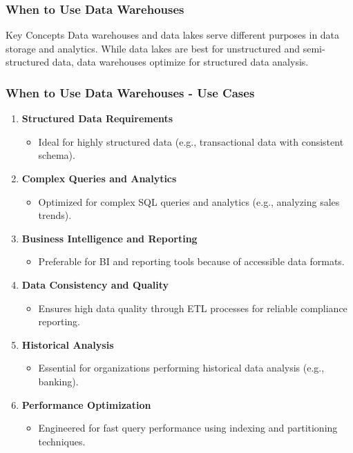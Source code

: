 \documentclass[aspectratio=169]{beamer}
\begin{document}
\begin{frame}[fragile]
  \frametitle{When to Use Data Warehouses}
  \begin{block}{Key Concepts}
    Data warehouses and data lakes serve different purposes in data storage and analytics.
    While data lakes are best for unstructured and semi-structured data, data warehouses optimize for structured data analysis.
  \end{block}
\end{frame}

\begin{frame}[fragile]
  \frametitle{When to Use Data Warehouses - Use Cases}
  \begin{enumerate}
    \item \textbf{Structured Data Requirements}
      \begin{itemize}
        \item Ideal for highly structured data (e.g., transactional data with consistent schema).
      \end{itemize}
      
    \item \textbf{Complex Queries and Analytics}
      \begin{itemize}
        \item Optimized for complex SQL queries and analytics (e.g., analyzing sales trends).
      \end{itemize}
      
    \item \textbf{Business Intelligence and Reporting}
      \begin{itemize}
        \item Preferable for BI and reporting tools because of accessible data formats.
      \end{itemize}
      
    \item \textbf{Data Consistency and Quality}
      \begin{itemize}
        \item Ensures high data quality through ETL processes for reliable compliance reporting.
      \end{itemize}
      
    \item \textbf{Historical Analysis}
      \begin{itemize}
        \item Essential for organizations performing historical data analysis (e.g., banking).
      \end{itemize}
      
    \item \textbf{Performance Optimization}
      \begin{itemize}
        \item Engineered for fast query performance using indexing and partitioning techniques.
      \end{itemize}
  \end{enumerate}
\end{frame}
\end{document}
